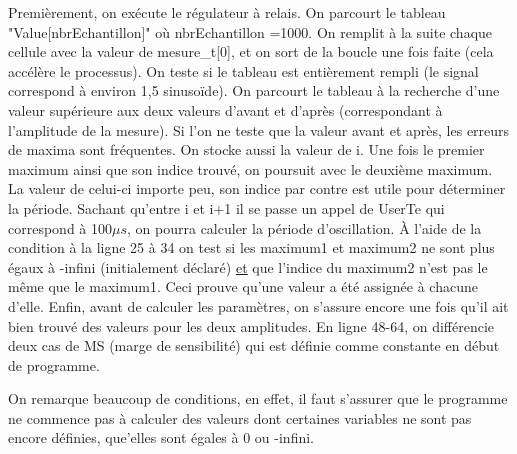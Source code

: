 Premièrement, on exécute le régulateur à relais. On parcourt le tableau "Value[nbrEchantillon]" où nbrEchantillon =1000. On remplit à la suite chaque cellule avec la valeur de mesure\_t[0], et on sort de la boucle une fois faite (cela accélère le processus). On teste si le tableau est entièrement rempli (le signal correspond à environ 1,5 sinusoïde). On parcourt le tableau à la recherche d'une valeur supérieure aux deux valeurs d'avant et d'après (correspondant à l'amplitude de la mesure). Si l'on ne teste que la valeur avant et après, les erreurs de maxima sont fréquentes. On stocke aussi la valeur de i. Une fois le premier maximum ainsi que son indice trouvé, on poursuit avec le deuxième maximum. La valeur de celui-ci importe peu, son indice par contre est utile pour déterminer la période. Sachant qu'entre i et i+1 il se passe un appel de UserTe qui correspond à 100$\mu s$, on pourra calculer la période d'oscillation. \`A l'aide de la condition à la ligne 25 à 34 on test si les maximum1 et maximum2 ne sont plus égaux à -infini (initialement déclaré) \underline{et} que l'indice du maximum2 n'est pas le même que le maximum1. Ceci prouve qu'une valeur a été assignée à chacune d'elle. Enfin, avant de calculer les paramètres, on s'assure encore une fois qu'il ait bien trouvé des valeurs pour les deux amplitudes. En ligne 48-64, on différencie deux cas de MS (marge de sensibilité) qui est définie comme constante en début de programme.


On remarque beaucoup de  conditions, en effet, il faut s'assurer que le programme ne commence pas à calculer des valeurs dont certaines variables ne sont pas encore définies, que'elles sont égales à 0 ou -infini.
\newpage

